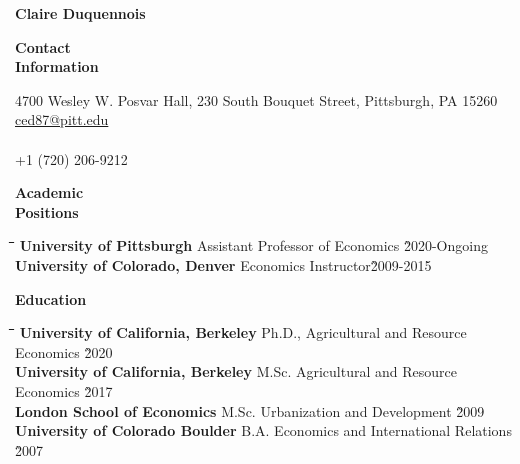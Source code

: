 \documentclass[10pt, oneside]{article}
\newcommand\mytabs{\hspace*{1cm}\=\hspace{1cm}\=\hspace{1cm}\=\hspace{1cm}\=\hspace{1cm}\=\hspace{1cm}\=\hspace{1cm}\=\hspace{1cm}\=\hspace{1cm}\=\hspace{1cm}}
\newenvironment{mysec}[1][\mytabs]
  {\begin{tabbing}#1\kill\ignorespaces}
  {\end{tabbing}}
\begin{document}


\begin{center}
{\large \bfseries Claire Duquennois} \\
\end{center} 

\begin{minipage}[t]{0.1\linewidth}
\textbf{Contact \\ Information}
\end{minipage}\hspace{0.05\linewidth}
\begin{minipage}[t]{0.8\linewidth}
4700 Wesley W. Posvar Hall, 230 South Bouquet Street, Pittsburgh, PA  15260\\
\href{mailto: ced87@pitt.edu}{ced87@pitt.edu} \\
\href{https://sites.google.com/view/claireduquennois/}{\color{blue}{https://sites.google.com/view/claireduquennois/} }\\
+1 (720) 206-9212
\end{minipage}\vspace{3mm}

\begin{minipage}[t]{0.1\linewidth}
\textbf{Academic\\ Positions}
\end{minipage}\hspace{0.05\linewidth}
\begin{minipage}[t]{0.8\linewidth}
\begin{mysec} 
\textbf{University of Pittsburgh} \>\>\>\>\>\>Assistant Professor of Economics \`2020-Ongoing\\
\textbf{University of Colorado, Denver} \>\>\>\>\>\>Economics Instructor\`2009-2015\\
\end{mysec}
\end{minipage}\vspace{3mm}


\begin{minipage}[t]{0.1\linewidth}
\textbf{Education}
\end{minipage}\hspace{0.05\linewidth}
\begin{minipage}[t]{0.8\linewidth}
\begin{mysec} 
\textbf{University of California, Berkeley} \>\>\>\>\>\> Ph.D., Agricultural and Resource Economics \`2020\\
\textbf{University of California, Berkeley} \>\>\>\>\> \>M.Sc. Agricultural and Resource Economics \`2017\\
\textbf{London School of Economics} \>\>\>\>\> \>M.Sc. Urbanization and Development \`2009\\
\textbf{University of Colorado Boulder} \>\>\>\>\>\> B.A. Economics and International Relations \`2007
\end{mysec}
\end{minipage}\vspace{3mm}
\end{document}
